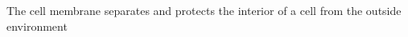 \documentclass[a4paper]{article}
\title{}
\date{}
\author{Mohammad Rahmani}
\begin{document}
\maketitle
    The cell membrane separates and protects the interior of a cell from the outside environment
    
    
\end{document}

